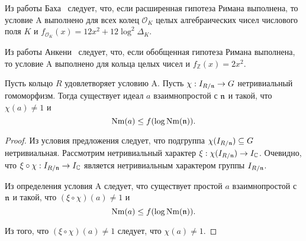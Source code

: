 \documentclass[_00_dissertation.tex]{subfiles}
\begin{document}
\begin{remark}
    Из работы Баха~\cite{source:Bach} следует, что, если расширенная гипотеза Римана выполнена, то условие A выполнено для всех колец $\mathcal{O}_K$ целых алгебраических чисел числового поля $K$ и $f_{\mathcal{O}_K}(x) = 12x^2 + 12\log^2 \Delta_{K}$.
\end{remark}

\begin{remark}
    Из работы Анкени~\cite{source:Ankeny} следует, что, если обобщенная гипотеза Римана выполнена, то условие A выполнено для кольца целых чисел и $f_{\mathbb{Z}}(x) = 2x^2$.
\end{remark}

\begin{proposition}\label{proposition:condition_A_with_any_homomorphism}
    Пусть кольцо $R$ удовлетворяет условию A.
    Пусть $\chi: I_{R/\mathfrak{n}} \to G$ нетривиальный гомоморфизм.
    Тогда существует идеал $a$ взаимнопростой с $\mathfrak{n}$ и такой, что $\chi(a) \neq 1$ и
    \begin{equation*}
        \textrm{Nm}(a) \le f(\log{\textrm{Nm}(\mathfrak{n})}).
    \end{equation*}
\end{proposition}
\begin{proof}
    Из условия предложения следует, что подгруппа $\chi(I_{R/\mathfrak{n}}) \subseteq G$ нетривиальная.
    Рассмотрим нетривиальный характер $\xi: \chi(I_{R/\mathfrak{n}}) \to I_{\mathbb{C}}$.
    Очевидно, что $\xi \circ \chi: I_{R/\mathfrak{n}} \to I_{\mathbb{C}}$ является нетривиальным характером группы $I_{R/\mathfrak{n}}$.
    
    Из определения условия A следует, что существует простой $a$ взаимнопростой с $\mathfrak{n}$ и такой, что $(\xi \circ \chi)(a) \neq 1$ и
    \begin{equation*}
        \textrm{Nm}(a) \le f(\log{\textrm{Nm}(\mathfrak{n})}).
    \end{equation*}
    
    Из того, что $(\xi \circ \chi)(a) \neq 1$ следует, что $\chi(a) \neq 1$.
\end{proof}
\end{document}
